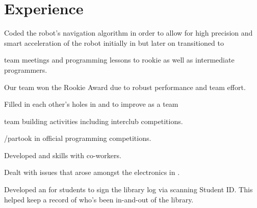 \documentclass[dvipsnames]{deedy-resume-openfont}
\begin{document}
  \hfill
  \begin{minipage}[t]{0.67\textwidth} 


  \section{Experience}

  \vspace{\topsep} %
  \begin{tightemize}
  \item Coded the robot's navigation algorithm in order to allow for high precision and smart acceleration of the robot initially in  but later on transitioned to 
  \item {} team meetings and  programming lessons to rookie as well as intermediate programmers.
  \item Our team won the Rookie Award due to robust performance and team effort.
  \end{tightemize}
  \sectionsep

  \begin{tightemize}
  \item Filled in each other's holes in  and  to improve as a team
  \item {} team building activities including interclub competitions.
  \item {}/partook in official programming competitions.
  \end{tightemize}
  \sectionsep

  \begin{tightemize}
  \item Developed  and  skills with co-workers.
  \item Dealt with issues that arose amongst the electronics in .
  \item Developed an  for students to sign the library log via scanning Student ID. This  helped keep a record of who's been in-and-out of the library.
  \end{tightemize}
  \sectionsep


\end{minipage}
\end{document}
